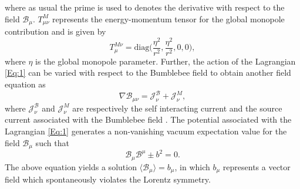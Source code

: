 \documentclass[aps,amsmath,amssymb,showpacs,showkeys]{revtex4}
\begin{document}
where as usual the prime is used to denotes the derivative with respect to the
field $\mathcal{B}_{\mu}$. $T^M_{\mu\nu}$ represents the energy-momentum 
tensor for the global monopole contribution and is given by \cite{20}
\begin{equation}
T^{M \nu}_{\mu}= \text{diag}\bigg(\frac{\eta^2}{r^2},\frac{\eta^2}{r^2},0,0\bigg),
\label{Eq:3}
\end{equation}
where $\eta$ is the global monopole parameter. 
Further, the action of the Lagrangian \eqref{Eq:1} can be varied with respect 
to the Bumblebee field to obtain another field equation as
\begin{equation}
\nabla \mathcal{B}_{\mu\nu} = \mathcal{J}^{\mathcal{B}}_\nu + \mathcal{J}^{M}_\nu,
\label{Eq:4}
\end{equation}
where $\mathcal{J}^{\mathcal{B}}_\nu $ and $\mathcal{J}^{M}_\nu$ are 
respectively the self interacting current and the source current associated 
with the Bumblebee field \cite{20}. The potential associated with the 
Lagrangian \eqref{Eq:1} generates a non-vanishing vacuum expectation value 
for the field $\mathcal{B}_{\mu}$ such that
\begin{equation}
\mathcal{B}_{\mu}\mathcal{B}^{\mu} \pm b^2 =0.
\label{Eq:5}
\end{equation}
The above equation yields a solution $\langle\mathcal{B}_{\mu}\rangle=b_{\mu}$,
in which $b_{\mu}$ represents a vector field which spontaneously violates the 
Lorentz symmetry. 
\end{document}
